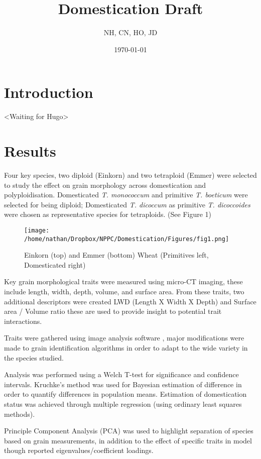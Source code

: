 \documentclass[a4paper, twocolumn]{article}
\author{NH, CN, HO, JD}
\date{\today}
\title{Domestication Draft}
\begin{document}
\maketitle



\section{Introduction}
\label{sec:orgf097e98}
<Waiting for Hugo>

\section{Results}
\label{sec:org5507ba5}


Four key species, two diploid (Einkorn) and two tetraploid (Emmer) were selected to study the effect on grain morphology across domestication and polyploidisation. Domesticated  \emph{T. monococcum} and primitive \emph{T. boeticum} were selected for being diploid; Domesticated \emph{T. dicoccum} as primitive \emph{T. dicoccoides} were chosen as representative species for tetraploids. (See Figure 1)

\begin{figure}[htbp]
\centering
\texttt{[image: /home/nathan/Dropbox/NPPC/Domestication/Figures/fig1.png]}
\caption{\label{fig:org77286a5}
Einkorn (top) and Emmer (bottom) Wheat (Primitives left, Domesticated right)}
\end{figure}


Key grain morphological traits were measured using micro-CT imaging, these include length, width, depth, volume, and surface area. From these traits, two additional descriptors were created LWD (Length X Width X Depth) and Surface area / Volume ratio these are used to provide insight to potential trait interactions.

Traits were gathered using image analysis software \cite{Hughes2017}, major modifications were made to grain identification algorithms in order to adapt to the wide variety in the species studied.

Analysis was performed using a Welch T-test for significance and confidence intervals. Kruchke's method was used for Bayesian estimation of difference \cite{Kruschke2012} in order to quantify differences in population means. Estimation of domestication status was achieved through multiple regression (using ordinary least squares methods).

Principle Component Analysis (PCA) was used to highlight separation of species based on grain measurements, in addition to the effect of specific traits in model though reported eigenvalues/coefficient loadings.
\end{document}
